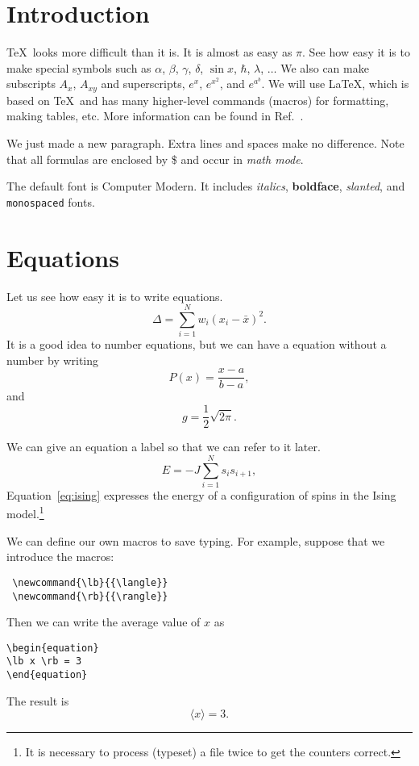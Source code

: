\documentclass[12pt]{article}
\begin{document}
\section{Introduction}
\TeX\ looks more difficult than it is. It is
almost as easy as $\pi$. See how easy it is to make special
symbols such as $\alpha$,
$\beta$, $\gamma$,
$\delta$, $\sin x$, $\hbar$, $\lambda$, $\ldots$ We also can make
subscripts
$A_{x}$, $A_{xy}$ and superscripts, $e^x$, $e^{x^2}$, and
$e^{a^b}$. We will use \LaTeX, which is based on \TeX\ and has
many higher-level commands (macros) for formatting, making
tables, etc. More information can be found in Ref.~\cite{latex}.

We just made a new paragraph. Extra lines and spaces make no
difference. Note that all formulas are enclosed by
\$ and occur in \textit{math mode}.

The default font is Computer Modern. It includes \textit{italics},
\textbf{boldface},
\textsl{slanted}, and \texttt{monospaced} fonts.

\section{Equations}
Let us see how easy it is to write equations.
\begin{equation}
  \Delta =\sum_{i=1}^N w_i (x_i - \bar{x})^2 .
\end{equation}
It is a good idea to number equations, but we can have a
equation without a number by writing
\begin{equation}
  P(x) = \frac{x - a}{b - a} , \nonumber
\end{equation}
and
\begin{equation}
  g = \frac{1}{2} \sqrt{2\pi} . \nonumber
\end{equation}

We can give an equation a label so that we can refer to it later.
\begin{equation}
  \label{eq:ising}
  E = -J \sum_{i=1}^N s_i s_{i+1} ,
\end{equation}
Equation~\eqref{eq:ising} expresses the energy of a configuration
of spins in the Ising model.\footnote{It is necessary to process (typeset) a
file twice to get the counters correct.}

We can define our own macros to save typing. For example, suppose
that we introduce the macros:
\begin{verbatim}
 \newcommand{\lb}{{\langle}}
 \newcommand{\rb}{{\rangle}}
\end{verbatim}
\newcommand{\lb}{{\langle}}
\newcommand{\rb}{{\rangle}}
Then we can write the average value of $x$ as
\begin{verbatim}
\begin{equation}
\lb x \rb = 3
\end{equation}
\end{verbatim}
The result is
\begin{equation}
  \lb x \rb = 3 .
\end{equation}
\end{document}

